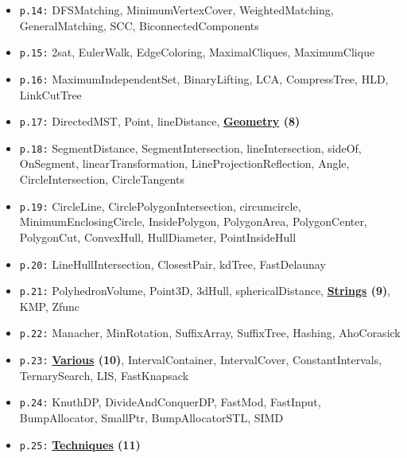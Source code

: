 \documentclass[9pt, a4paper, notitlepage]{extreport}
\begin{document}
\begin{multicols*}{3}
\begin{itemize}[noitemsep]
		\item \texttt{p.14:} DFSMatching, MinimumVertexCover, WeightedMatching, GeneralMatching, SCC, BiconnectedComponents
		\item \texttt{p.15:} 2sat, EulerWalk, EdgeColoring, MaximalCliques, MaximumClique
		\item \texttt{p.16:} MaximumIndependentSet, BinaryLifting, LCA, CompressTree, HLD, LinkCutTree
		\item \texttt{p.17:} DirectedMST, Point, lineDistance, \textbf{\underline{Geometry} (8)}
		\item \texttt{p.18:} SegmentDistance, SegmentIntersection, lineIntersection, sideOf, OnSegment, linearTransformation, LineProjectionReflection, Angle, CircleIntersection, CircleTangents
		\item \texttt{p.19:} CircleLine, CirclePolygonIntersection, circumcircle, MinimumEnclosingCircle, InsidePolygon, PolygonArea, PolygonCenter, PolygonCut, ConvexHull, HullDiameter, PointInsideHull
		\item \texttt{p.20:} LineHullIntersection, ClosestPair, kdTree, FastDelaunay
		\item \texttt{p.21:} PolyhedronVolume, Point3D, 3dHull, sphericalDistance, \textbf{\underline{Strings} (9)}, KMP, Zfunc
		\item \texttt{p.22:} Manacher, MinRotation, SuffixArray, SuffixTree, Hashing, AhoCorasick
		\item \texttt{p.23:} \textbf{\underline{Various} (10)}, IntervalContainer, IntervalCover, ConstantIntervals, TernarySearch, LIS, FastKnapsack
		\item \texttt{p.24:} KnuthDP, DivideAndConquerDP, FastMod, FastInput, BumpAllocator, SmallPtr, BumpAllocatorSTL, SIMD
		\item \texttt{p.25:} \textbf{\underline{Techniques} (11)}
	\end{itemize}


	\end{multicols*}
\end{document}
